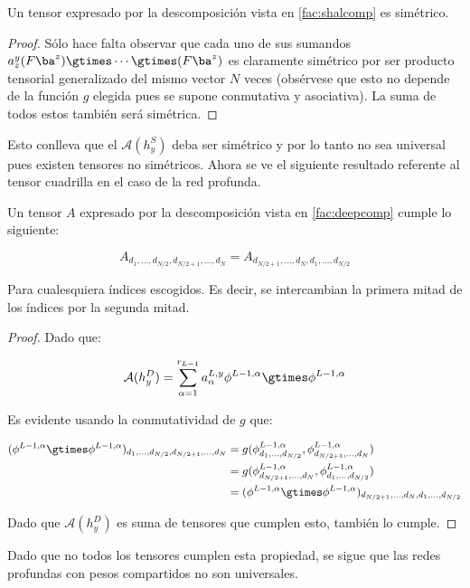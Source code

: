 \begin{prop}
Un tensor expresado por la descomposición vista en \eqref{fac:shalcomp} es simétrico.
\end{prop}
\begin{proof}
Sólo hace falta observar que cada uno de sus sumandos $a^y_z(F\ba^{z})\gtimes\cdots \gtimes(F\ba^{z})$ es claramente simétrico por ser producto tensorial generalizado del mismo vector $N$ veces (obsérvese que esto no depende de la función $g$ elegida pues se supone conmutativa y asociativa). La suma de todos estos también será simétrica.
\end{proof}

Esto conlleva que el $\mathcal{A}(h_y^S)$ deba ser simétrico y por lo tanto no sea universal pues existen tensores no simétricos. Ahora se ve el siguiente resultado referente al tensor cuadrilla en el caso de la red profunda.

\begin{prop}
Un tensor $A$ expresado por la descomposición vista en \eqref{fac:deepcomp} cumple lo siguiente:

$$
A_{d_1,... ,d_{N/2},d_{N/2 + 1},... ,d_N} = A_{d_{N/2 + 1},... ,d_N,d_1,... ,d_{N/2}} 
$$ 

Para cualesquiera índices escogidos. Es decir, se intercambian la primera mitad de los índices por la segunda mitad.
\end{prop}
\begin{proof}

Dado que:

$$
\mathcal{A}(h_y^D) = \sum^{r_{L-1}}_{\alpha=1}a_\alpha^{L,y}\phi^{L-1,\alpha}\gtimes\phi^{L-1,\alpha}
$$

Es evidente usando la conmutatividad de $g$ que:


\begin{align*}
(\phi^{L-1,\alpha}\gtimes\phi^{L-1,\alpha})_{d_1,... ,d_{N/2},d_{N/2 + 1},... ,d_N} &= g(\phi^{L-1,\alpha}_{d_1,... ,d_{N/2}}, \phi^{L-1,\alpha}_{d_{N/2 + 1},... ,d_N}) \\ &= g(\phi^{L-1,\alpha}_{d_{N/2 + 1},... ,d_N}, \phi^{L-1,\alpha}_{d_1,... ,d_{N/2}}) \\ &=  (\phi^{L-1,\alpha}\gtimes\phi^{L-1,\alpha})_{d_{N/2 + 1},... ,d_N,d_1,... ,d_{N/2}}
\end{align*}


Dado que $\mathcal{A}(h_y^D)$ es suma de tensores que cumplen esto, también lo cumple.
\end{proof}

Dado que no todos los tensores cumplen esta propiedad, se sigue que las redes profundas con pesos compartidos no son universales.

